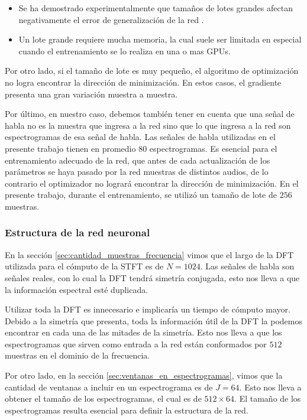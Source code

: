 \begin{itemize}
	\item Se ha demostrado experimentalmente que tamaños de lotes grandes afectan negativamente el error de generalización de la red \cite{on_large_batch_training}.
	\item Un lote grande requiere mucha memoria, la cual suele ser limitada en especial cuando el entrenamiento se lo realiza en una o mas GPUs.
\end{itemize}

Por otro lado, si el tamaño de lote es muy pequeño, el algoritmo de optimización no logra encontrar la dirección de minimización. En estos casos, el gradiente presenta una gran variación muestra a muestra.

Por último, en nuestro caso, debemos también tener en cuenta que una señal de habla no es la muestra que ingresa a la red sino que lo que ingresa a la red son espectrogramas de esa señal de habla. Las señales de habla utilizadas en el presente trabajo tienen en promedio 80 espectrogramas. Es esencial para el entrenamiento adecuado de la red, que antes de cada actualización de los parámetros se haya pasado por la red muestras de distintos audios, de lo contrario el optimizador no logrará encontrar la dirección de minimización. En el presente trabajo, durante el entrenamiento, se utilizó un tamaño de lote de $256$ muestras.

\subsubsection{Estructura de la red neuronal}

En la sección \ref{sec:cantidad_muestras_frecuencia} vimos que el largo de la DFT utilizada para el cómputo de la STFT es de $N=1024$. Las señales de habla son señales reales, con lo cual la DFT tendrá simetría conjugada, esto nos lleva a que la información espectral esté duplicada.

Utilizar toda la DFT es innecesario e implicaría un tiempo de cómputo mayor. Debido a la simetría que presenta, toda la información útil de la DFT la podemos encontrar en cada una de las mitades de la simetría. Esto nos lleva a que los espectrogramas que sirven como entrada a la red están conformados por $512$ muestras en el dominio de la frecuencia.

Por otro lado, en la sección \ref{sec:ventanas_en_espectrogramas}, vimos que la cantidad de ventanas a incluir en un espectrograma es de $J=64$. Esto nos lleva a obtener el tamaño de los espectrogramas, el cual es de $512 \times 64$. El tamaño de los espectrogramas resulta esencial para definir la estructura de la red.

